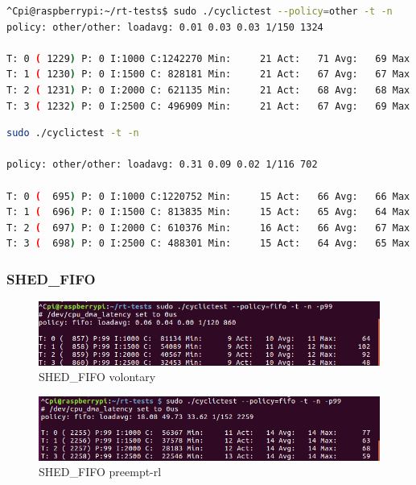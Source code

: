 \documentclass[10pt,a4paper]{article}
\begin{document}
\begin{lstlisting}[language=bash,caption={preempt-rt kernel}]
^Cpi@raspberrypi:~/rt-tests$ sudo ./cyclictest --policy=other -t -n
policy: other/other: loadavg: 0.01 0.03 0.03 1/150 1324          

T: 0 ( 1229) P: 0 I:1000 C:1242270 Min:     21 Act:   71 Avg:   69 Max:    2541
T: 1 ( 1230) P: 0 I:1500 C: 828181 Min:     21 Act:   67 Avg:   67 Max:    1991
T: 2 ( 1231) P: 0 I:2000 C: 621135 Min:     21 Act:   68 Avg:   68 Max:    4476
T: 3 ( 1232) P: 0 I:2500 C: 496909 Min:     21 Act:   67 Avg:   69 Max:    3180
\end{lstlisting}
\begin{lstlisting}[language=bash,caption={volontary kernel}]
sudo ./cyclictest -t -n

policy: other/other: loadavg: 0.31 0.09 0.02 1/116 702          

T: 0 (  695) P: 0 I:1000 C:1220752 Min:     15 Act:   66 Avg:   66 Max:     528
T: 1 (  696) P: 0 I:1500 C: 813835 Min:     15 Act:   65 Avg:   64 Max:     490
T: 2 (  697) P: 0 I:2000 C: 610376 Min:     16 Act:   66 Avg:   67 Max:    1354
T: 3 (  698) P: 0 I:2500 C: 488301 Min:     15 Act:   64 Avg:   65 Max:     545

\end{lstlisting}

\subsubsection{SHED\_FIFO}
\begin{figure}[H]
\includegraphics[width=16cm]{Voluntary-Fifo-WithoutHackbench.png}
\caption{SHED\_FIFO volontary}
\end{figure}
\begin{figure}[H]
\includegraphics[width=16cm]{Preempt-Fifo-WithoutHackbench.png}
\caption{SHED\_FIFO preempt-rl}
\end{figure}
\end{document}
